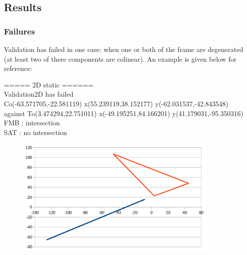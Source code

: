 \documentclass[12pt, a4paper]{article}
\begin{document}
\begin{scriptsize}
\begin{ttfamily}

\end{ttfamily}
\end{scriptsize}

\subsection{Results}

\subsubsection{Failures}

Validation has failed in one case: when one or both of the frame are degenerated (at least two of there components are colinear). An example is given below for reference:\\

\begin{scriptsize}
\begin{ttfamily}
===== 2D static ======\\
Validation2D has failed\\
Co(-63.571705,-22.581119) x(55.239119,38.152177) y(-62.031537,-42.843548) against To(3.474294,22.751011) x(-49.195251,84.166201) y(41.179031,-95.350316)\\
FMB : intersection\\
SAT : no intersection\\
\end{ttfamily}
\end{scriptsize}

\begin{center}
\begin{figure}[H]
\centering\includegraphics[width=10cm]{./degeneratedFrame.png}\\
\end{figure}
\end{center}
\end{document}
